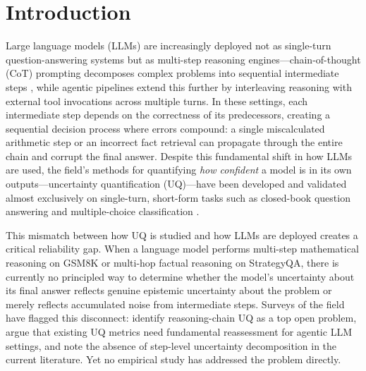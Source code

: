 
\section{Introduction}
\label{sec:intro}

Large language models (LLMs) are increasingly deployed not as single-turn question-answering systems but as multi-step reasoning engines---chain-of-thought (CoT) prompting decomposes complex problems into sequential intermediate steps \cite{KadavathEtAl2022, XiongEtAl2023}, while agentic pipelines extend this further by interleaving reasoning with external tool invocations across multiple turns. In these settings, each intermediate step depends on the correctness of its predecessors, creating a sequential decision process where errors compound: a single miscalculated arithmetic step or an incorrect fact retrieval can propagate through the entire chain and corrupt the final answer. Despite this fundamental shift in how LLMs are used, the field's methods for quantifying \emph{how confident} a model is in its own outputs---uncertainty quantification (UQ)---have been developed and validated almost exclusively on single-turn, short-form tasks such as closed-book question answering and multiple-choice classification \cite{FarquharEtAl2024, KuhnEtAl2023, TianEtAl2023, DuanEtAl2023}.

This mismatch between how UQ is studied and how LLMs are deployed creates a critical reliability gap. When a language model performs multi-step mathematical reasoning on GSM8K or multi-hop factual reasoning on StrategyQA, there is currently no principled way to determine whether the model's uncertainty about its final answer reflects genuine epistemic uncertainty about the problem or merely reflects accumulated noise from intermediate steps. Surveys of the field have flagged this disconnect: \citet{GengEtAl2023} identify reasoning-chain UQ as a top open problem, \citet{KirchhofEtAl2025} argue that existing UQ metrics need fundamental reassessment for agentic LLM settings, and \citet{XiaEtAl2025} note the absence of step-level uncertainty decomposition in the current literature. Yet no empirical study has addressed the problem directly.


